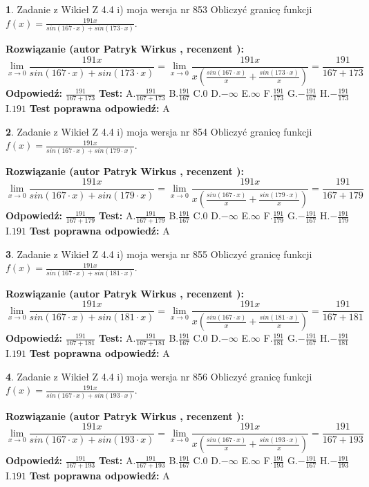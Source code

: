 \documentclass[12pt, a4paper]{article}
\theoremstyle{definition} %
\newtheorem{zad}{}
\newcommand{\zadStart}[1]{\begin{zad}#1\newline}
\newcommand{\zadStop}{\end{zad}}
\newcommand{\rozwStart}[2]{\noindent \textbf{Rozwiązanie (autor #1 , recenzent #2): }\newline}
\newcommand{\rozwStop}{\newline}
\newcommand{\odpStart}{\noindent \textbf{Odpowiedź:}\newline}
\newcommand{\odpStop}{\newline}
\newcommand{\testStart}{\noindent \textbf{Test:}\newline}
\newcommand{\testStop}{\newline}
\newcommand{\kluczStart}{\noindent \textbf{Test poprawna odpowiedź:}\newline}
\newcommand{\kluczStop}{\newline}
\begin{document}
\zadStart{Zadanie z Wikieł Z 4.4 i) moja wersja nr 853}
Obliczyć granicę funkcji $f(x)=\frac{191x}{sin(167\cdot x) +sin(173\cdot x)}$.
\zadStop
\rozwStart{Patryk Wirkus}{}
$$\lim\limits_{x\to 0}\frac{191x}{sin(167\cdot x) +sin(173\cdot x)}=\lim\limits_{x\to 0}\frac{191x}{x(\frac{sin(167\cdot x)}{x}+\frac{sin(173\cdot x)}{x})}=\frac{191}{167+173}$$
\rozwStop
\odpStart
$\frac{191}{167+173}$
\odpStop
\testStart
A.$\frac{191}{167+173}$
B.$\frac{191}{167}$
C.$0$
D.$-\infty$
E.$\infty$
F.$\frac{191}{173}$
G.$-\frac{191}{167}$
H.$-\frac{191}{173}$
I.$191$
\testStop
\kluczStart
A
\kluczStop



\zadStart{Zadanie z Wikieł Z 4.4 i) moja wersja nr 854}
Obliczyć granicę funkcji $f(x)=\frac{191x}{sin(167\cdot x) +sin(179\cdot x)}$.
\zadStop
\rozwStart{Patryk Wirkus}{}
$$\lim\limits_{x\to 0}\frac{191x}{sin(167\cdot x) +sin(179\cdot x)}=\lim\limits_{x\to 0}\frac{191x}{x(\frac{sin(167\cdot x)}{x}+\frac{sin(179\cdot x)}{x})}=\frac{191}{167+179}$$
\rozwStop
\odpStart
$\frac{191}{167+179}$
\odpStop
\testStart
A.$\frac{191}{167+179}$
B.$\frac{191}{167}$
C.$0$
D.$-\infty$
E.$\infty$
F.$\frac{191}{179}$
G.$-\frac{191}{167}$
H.$-\frac{191}{179}$
I.$191$
\testStop
\kluczStart
A
\kluczStop



\zadStart{Zadanie z Wikieł Z 4.4 i) moja wersja nr 855}
Obliczyć granicę funkcji $f(x)=\frac{191x}{sin(167\cdot x) +sin(181\cdot x)}$.
\zadStop
\rozwStart{Patryk Wirkus}{}
$$\lim\limits_{x\to 0}\frac{191x}{sin(167\cdot x) +sin(181\cdot x)}=\lim\limits_{x\to 0}\frac{191x}{x(\frac{sin(167\cdot x)}{x}+\frac{sin(181\cdot x)}{x})}=\frac{191}{167+181}$$
\rozwStop
\odpStart
$\frac{191}{167+181}$
\odpStop
\testStart
A.$\frac{191}{167+181}$
B.$\frac{191}{167}$
C.$0$
D.$-\infty$
E.$\infty$
F.$\frac{191}{181}$
G.$-\frac{191}{167}$
H.$-\frac{191}{181}$
I.$191$
\testStop
\kluczStart
A
\kluczStop



\zadStart{Zadanie z Wikieł Z 4.4 i) moja wersja nr 856}
Obliczyć granicę funkcji $f(x)=\frac{191x}{sin(167\cdot x) +sin(193\cdot x)}$.
\zadStop
\rozwStart{Patryk Wirkus}{}
$$\lim\limits_{x\to 0}\frac{191x}{sin(167\cdot x) +sin(193\cdot x)}=\lim\limits_{x\to 0}\frac{191x}{x(\frac{sin(167\cdot x)}{x}+\frac{sin(193\cdot x)}{x})}=\frac{191}{167+193}$$
\rozwStop
\odpStart
$\frac{191}{167+193}$
\odpStop
\testStart
A.$\frac{191}{167+193}$
B.$\frac{191}{167}$
C.$0$
D.$-\infty$
E.$\infty$
F.$\frac{191}{193}$
G.$-\frac{191}{167}$
H.$-\frac{191}{193}$
I.$191$
\testStop
\kluczStart
A
\kluczStop
\end{document}
